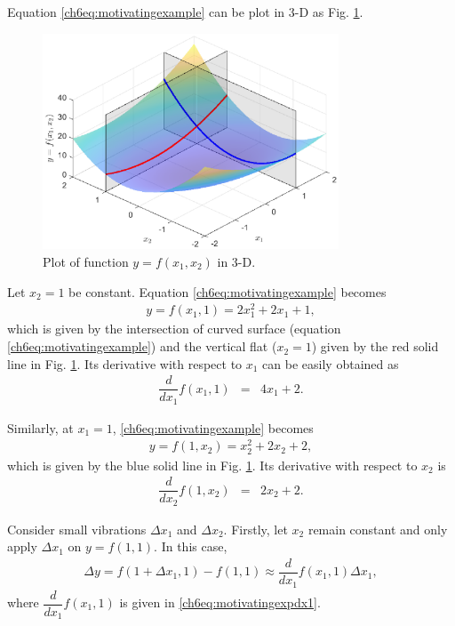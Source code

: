 Equation \eqref{ch6eq:motivatingexample} can be plot in 3-D as Fig. \ref{ch6fig_motivatingexp}.
\begin{figure}
	\centering
	\includegraphics[width=250pt]{chapters/part-2/figures/fig_motivatingexp.eps}
	\caption{Plot of function $y=f(x_1, x_2)$ in 3-D.} \label{ch6fig_motivatingexp}
\end{figure}

Let $x_2=1$ be constant. Equation \eqref{ch6eq:motivatingexample} becomes
\begin{eqnarray}
	y = f(x_1, 1) = 2x_1^2 + 2x_1 + 1, \nonumber
\end{eqnarray}
which is given by the intersection of  curved surface (equation \eqref{ch6eq:motivatingexample}) and the vertical flat ($x_2=1$) given by the red solid line in Fig. \ref{ch6fig_motivatingexp}. Its derivative with respect to $x_1$ can be easily obtained as
\begin{eqnarray}
	\dfrac{d}{dx_1}f(x_1,1) &=& 4x_1 + 2. \label{ch6eq:motivatingexpdx1}
\end{eqnarray}

Similarly, at $x_1 = 1$, \eqref{ch6eq:motivatingexample} becomes
\begin{eqnarray}
	y = f(1, x_2) = x_2^2 + 2x_2 + 2, \nonumber
\end{eqnarray}
which is given by the blue solid line in Fig. \ref{ch6fig_motivatingexp}. Its derivative with respect to $x_2$ is
\begin{eqnarray}
	\dfrac{d}{dx_2}f(1,x_2) &=& 2x_2 + 2. \label{ch6eq:motivatingexpdx2}
\end{eqnarray}

Consider small vibrations $\Delta x_1$ and $\Delta x_2$. Firstly, let $x_2$ remain constant and only apply $\Delta x_1$ on $y = f(1,1)$. In this case,
\begin{eqnarray}
	\Delta y = f(1+\Delta x_1, 1) - f(1, 1) \approx \dfrac{d}{dx_1}f(x_1,1) \Delta x_1, \label{ch6eq:partialdifx1}
\end{eqnarray}
where $\dfrac{d}{dx_1}f(x_1,1)$ is given in \eqref{ch6eq:motivatingexpdx1}.

